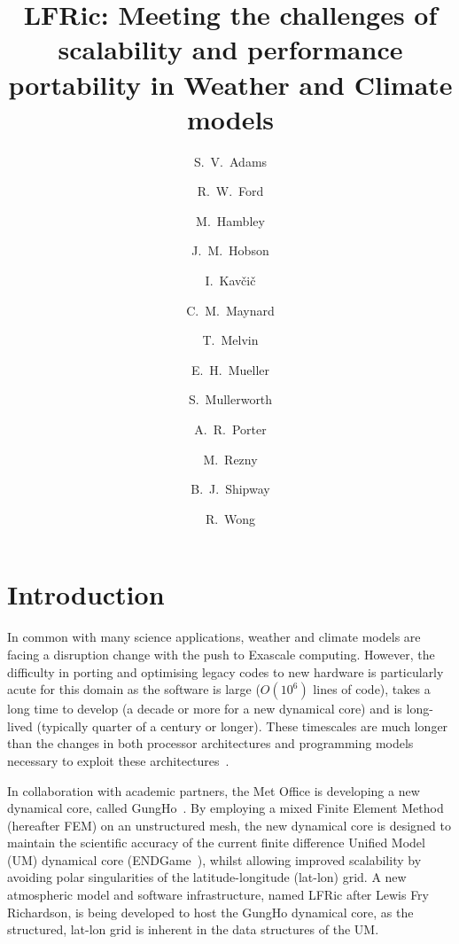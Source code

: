 \documentclass[review,times]{elsarticle}
\begin{document}
\begin{frontmatter}

\title{LFRic: Meeting the challenges of scalability and performance portability in Weather and Climate models}

\author[met]{S.~V.~Adams}
\author[hartree]{R.~W.~Ford}
\author[met]{M.~Hambley}
\author[met]{J.~M.~Hobson}
\author[met]{I.~Kav\v ci\v c}
\author[met,read]{C.~M.~Maynard}
\author[met]{T.~Melvin}
\author[bath]{E.~H.~Mueller}
\author[met]{S.~Mullerworth}
\author[hartree]{A.~R.~Porter}
\author[downunder]{M.~Rezny}
\author[met]{B.~J.~Shipway}
\author[met]{R.~Wong}


\address[met]{Met Office, FitzRoy Road, Exeter, EX1 3PB}
\address[hartree]{Hartree Centre, STFC Daresbury, Grim up North}
\address[read]{Department of Computer Science, Polly Vacher Building,
  University of Reading, Reading, UK, RG6 6AY}
\address[bath]{Department of Mathematics, University of Bath, Bath}
\address[downunder]{Monash University, Melbourne, Australia}

\begin{abstract}
\end{abstract}

\begin{keyword}

\end{keyword}

\end{frontmatter}


\newpage
\section{\label{sec:intro}Introduction}

In common with many science applications, weather and climate models are 
facing a disruption change with the push to Exascale computing. However, the
difficulty in porting and optimising legacy codes to new hardware is
particularly acute for this domain as the software is large ($O(10^6)$
lines of code), takes a long time to develop (a decade or more for a new
dynamical core) and is long-lived (typically quarter of a century or longer).
These timescales are much longer than the changes in both processor
architectures and programming models necessary to exploit these
architectures~\cite{gmd-2017-186}.

In collaboration with academic partners, the Met Office is developing
a new dynamical core, called GungHo~\cite{melvin2018}. By employing a
mixed Finite Element Method (hereafter FEM) on an unstructured mesh, the new dynamical
core is designed to maintain the scientific accuracy of the current finite difference
Unified Model (UM) dynamical core (ENDGame~\cite{QJ:QJ2235}), whilst
allowing improved scalability by avoiding polar singularities of the
latitude-longitude (lat-lon) grid. A new atmospheric model and software infrastructure,
named LFRic after Lewis Fry Richardson, is being developed to host the
GungHo dynamical core, as the structured,  lat-lon
grid is inherent in the data structures of the UM.
\end{document}
